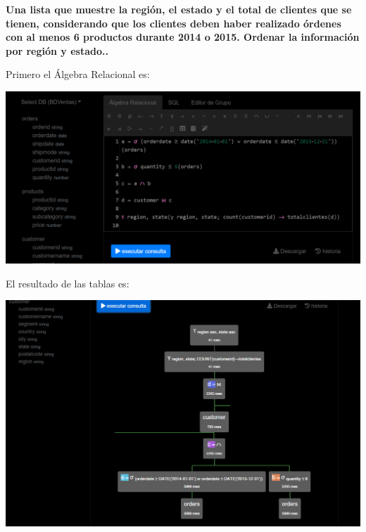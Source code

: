 \textbf{Una lista que muestre la región, el estado y el total de clientes que se tienen, considerando que los clientes deben
haber realizado órdenes con al menos 6 productos durante 2014 o 2015. Ordenar la información por región y estado..} \vspace{.3cm}

Primero el Álgebra Relacional es:

\begin{center}
    \includegraphics[width=14cm]{resources/pregunta2/2.6.1.png}
\end{center}


El resultado de las tablas es:

\begin{center}
    \includegraphics[width=14cm]{resources/pregunta2/2.6.2.png}
\end{center}
